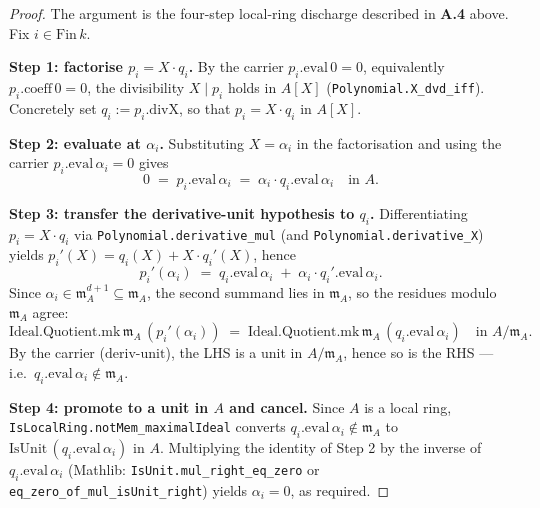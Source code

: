 \begin{proof}

\leanok
The argument is the four-step local-ring discharge described in
\textbf{A.4} above. Fix $i \in \mathrm{Fin}\,k$.

\textbf{Step 1: factorise $p_i = X \cdot q_i$.}
By the carrier $p_i.\mathrm{eval}\,0 = 0$, equivalently
$p_i.\mathrm{coeff}\,0 = 0$, the divisibility
$X \mid p_i$ holds in $A[X]$
(\texttt{Polynomial.X\_dvd\_iff}). Concretely set
$q_i := p_i.\mathrm{divX}$, so that
$p_i = X \cdot q_i$ in $A[X]$.

\textbf{Step 2: evaluate at $\alpha_i$.}
Substituting $X = \alpha_i$ in the factorisation and using the
carrier $p_i.\mathrm{eval}\,\alpha_i = 0$ gives
\[
0 \;=\; p_i.\mathrm{eval}\,\alpha_i
\;=\; \alpha_i \cdot q_i.\mathrm{eval}\,\alpha_i
\quad\text{in } A.
\]

\textbf{Step 3: transfer the derivative-unit hypothesis to $q_i$.}
Differentiating $p_i = X \cdot q_i$ via
\texttt{Polynomial.derivative\_mul} (and
\texttt{Polynomial.derivative\_X}) yields
$p_i'(X) = q_i(X) + X \cdot q_i'(X)$, hence
\[
p_i'(\alpha_i)
\;=\; q_i.\mathrm{eval}\,\alpha_i
\;+\; \alpha_i \cdot q_i'.\mathrm{eval}\,\alpha_i.
\]
Since $\alpha_i \in \mathfrak m_A^{d+1} \subseteq \mathfrak m_A$,
the second summand lies in $\mathfrak m_A$, so the residues
modulo $\mathfrak m_A$ agree:
\[
\mathrm{Ideal.Quotient.mk}\,\mathfrak m_A\,(p_i'(\alpha_i))
\;=\;
\mathrm{Ideal.Quotient.mk}\,\mathfrak m_A\,(q_i.\mathrm{eval}\,\alpha_i)
\quad\text{in } A/\mathfrak m_A.
\]
By the carrier ($\mathrm{deriv}\text{-}\mathrm{unit}$), the LHS
is a unit in $A/\mathfrak m_A$, hence so is the RHS — i.e.\
$q_i.\mathrm{eval}\,\alpha_i \notin \mathfrak m_A$.

\textbf{Step 4: promote to a unit in $A$ and cancel.}
Since $A$ is a local ring,
\texttt{IsLocalRing.notMem\_maximalIdeal} converts
$q_i.\mathrm{eval}\,\alpha_i \notin \mathfrak m_A$ to
$\mathrm{IsUnit}\,(q_i.\mathrm{eval}\,\alpha_i)$ in $A$. Multiplying
the identity of Step 2 by the inverse of
$q_i.\mathrm{eval}\,\alpha_i$ (Mathlib:
\texttt{IsUnit.mul\_right\_eq\_zero} or
\texttt{eq\_zero\_of\_mul\_isUnit\_right}) yields $\alpha_i = 0$,
as required.


\end{proof}
